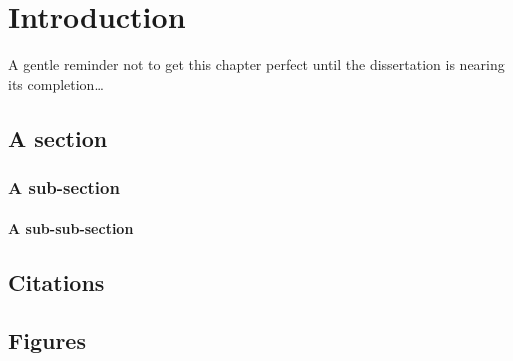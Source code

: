 \chapter{Introduction} \label{chap:intro}
A gentle reminder not to get this chapter perfect until the dissertation is nearing its completion\ldots

\section{A section}

\subsection{A sub-section}

\subsubsection{A sub-sub-section}



\section{Citations}



\section{Figures}
